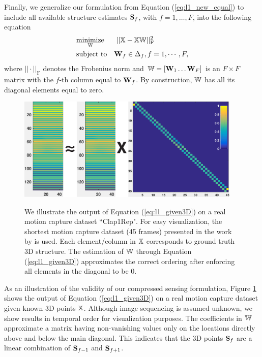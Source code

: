 Finally, we generalize our formulation from Equation (\ref{eq:l1_new_equal}) to include all available structure estimates $\mathbf S_f$, with  $f=1,\dotsc,F$, into the following equation
\begin{equation}
\begin{aligned}
& \underset{\mathbb W}{\text{minimize}}&& ~ || \mathbb X - \mathbb X \mathbb W||_\text{F}^2\\
& \text{subject to} && \mathbf W_f \in \Delta_f, f=1,\cdots,F,
\end{aligned}
\label{eq:l1_given3D}
\end{equation}
where $||\cdot||_\text{F}$ denotes the Frobenius norm and $\mathbb W=[\mathbf W_1 \dots \mathbf W_F]$ is an $F\times F$ matrix
with the $f$-th column equal to $\mathbf W_f$.
By construction, $\mathbb W$ has all its diagonal elements equal to zero.

\begin{figure}
  \centering
  \includegraphics[width=0.95\textwidth]{chapter5/resource/l1.pdf}\\
  \caption{We illustrate the output of Equation (\ref{eq:l1_given3D}) on a real motion capture dataset ``Clap1Rep". 
For easy visualization, the shortest motion capture dataset (45 frames) presented in the work by \citet{cg-2007-2} is used. Each element/column in $\mathbb X$  corresponds to  ground truth 3D structure. The estimation of $\mathbb W$ through Equation (\ref{eq:l1_given3D}) approximates the correct ordering after enforcing all elements in the diagonal to be $0$.}
  \label{fig:principle}
\end{figure}

As an illustration of the validity of our compressed sensing formulation, Figure \ref{fig:principle} shows the output of Equation (\ref{eq:l1_given3D}) on a real motion capture dataset given known 3D points $\mathbb X$. 
Although image sequencing is assumed unknown, we show results in temporal order for visualization purposes.
The coefficients in $\mathbb W$ approximate a matrix having non-vanishing values only on the locations directly above and below the main diagonal.
This indicates that the 3D points $\mathbf S_f$ are a linear combination of $\mathbf S_{f-1}$ and $\mathbf S_{f+1}$. 

